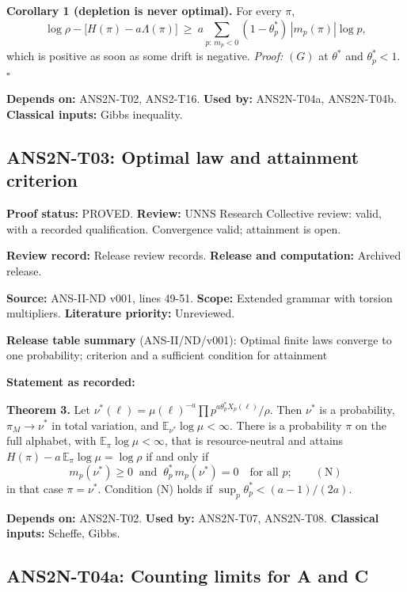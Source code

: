 \documentclass[
  11pt,
]{article}
\begin{document}
\textbf{Corollary 1 (depletion is never optimal).} For every \(\pi\),
\[\log\rho-\big[H(\pi)-a\Lambda(\pi)\big]\ \ge\ a\sum_{p:\,m_p<0}(1-\theta^\ast_p)\,|m_p(\pi)|\log p,\]
which is positive as soon as some drift is negative. \emph{Proof:}
\((G)\) at \(\theta^\ast\) and \(\theta^\ast_p<1\). \(\square\)

\textbf{Depends on:} ANS2N-T02, ANS2-T16. \textbf{Used by:} ANS2N-T04a,
ANS2N-T04b. \textbf{Classical inputs:} Gibbs inequality.

\hypertarget{ans2n-t03-optimal-law-and-attainment-criterion}{%
\subsection{ANS2N-T03: Optimal law and attainment
criterion}\label{ans2n-t03-optimal-law-and-attainment-criterion}}

\textbf{Proof status:} PROVED. \textbf{Review:} UNNS Research Collective
review: valid, with a recorded qualification. Convergence valid;
attainment is open.

\textbf{Review record:} Release review records. \textbf{Release and
computation:} Archived release.

\textbf{Source:} ANS-II-ND v001, lines 49-51. \textbf{Scope:} Extended
grammar with torsion multipliers. \textbf{Literature priority:}
Unreviewed.

\textbf{Release table summary} (ANS-II/ND/v001): Optimal finite laws
converge to one probability; criterion and a sufficient condition for
attainment

\textbf{Statement as recorded:}

\textbf{Theorem 3.} Let
\(\nu^\ast(\ell)=\mu(\ell)^{-a}\prod p^{a\theta^\ast_pX_p(\ell)}/\rho\).
Then \(\nu^\ast\) is a probability, \(\pi_M\to\nu^\ast\) in total
variation, and \(\mathbb E_{\nu^\ast}\log\mu<\infty\). There is a
probability \(\pi\) on the full alphabet, with
\(\mathbb E_\pi\log\mu<\infty\), that is resource-neutral and attains
\(H(\pi)-a\,\mathbb E_\pi\log\mu=\log\rho\) if and only if
\[m_p(\nu^\ast)\ge0\ \text{ and }\ \theta^\ast_p\,m_p(\nu^\ast)=0\quad\text{for all }p;\qquad(\mathrm N)\]
in that case \(\pi=\nu^\ast\). Condition (N) holds if
\(\sup_p\theta^\ast_p<(a-1)/(2a)\).

\textbf{Depends on:} ANS2N-T02. \textbf{Used by:} ANS2N-T07, ANS2N-T08.
\textbf{Classical inputs:} Scheffe, Gibbs.

\hypertarget{ans2n-t04a-counting-limits-for-a-and-c}{%
\subsection{ANS2N-T04a: Counting limits for A and
C}\label{ans2n-t04a-counting-limits-for-a-and-c}}
\end{document}
